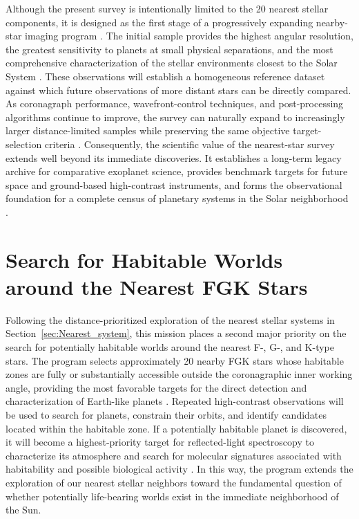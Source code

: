 Although the present survey is intentionally limited to the 20 nearest stellar components, it is designed as the first stage of a progressively expanding nearby-star imaging program \cite{LUVOIR2019}. 
The initial sample provides the highest angular resolution, the greatest sensitivity to planets at small physical separations, and the most comprehensive characterization of the stellar environments closest to the Solar System \cite{Guyon2006}. 
These observations will establish a homogeneous reference dataset against which future observations of more distant stars can be directly compared. As coronagraph performance, wavefront-control techniques, and post-processing algorithms continue to improve, the survey can naturally expand to increasingly larger distance-limited samples while preserving the same objective target-selection criteria \cite{Currie2022}. 
Consequently, the scientific value of the nearest-star survey extends well beyond its immediate discoveries. It establishes a long-term legacy archive for comparative exoplanet science, provides benchmark targets for future space and ground-based high-contrast instruments, and forms the observational foundation for a complete census of planetary systems in the Solar neighborhood \cite{LUVOIR2019}.

% 
\section{Search for Habitable Worlds around the Nearest FGK Stars}
\label{sec:Search-Habitable}

Following the distance-prioritized exploration of the nearest stellar systems in
Section~\ref{sec:Nearest_system}, this mission places a second major priority on the search for potentially
habitable worlds around the nearest F-, G-, and K-type stars. The program selects 
approximately 20 nearby FGK stars whose habitable zones are fully or substantially 
accessible outside the coronagraphic inner working angle, providing the most favorable 
targets for the direct detection and characterization of Earth-like planets
\cite{Kopparapu13,Stark2014}. Repeated high-contrast observations will be used to 
search for planets, constrain their orbits, and identify candidates located within the 
habitable zone. If a potentially habitable planet is discovered, it will become a 
highest-priority target for reflected-light spectroscopy to characterize its atmosphere 
and search for molecular signatures associated with habitability and possible biological 
activity \cite{Schwieterman2018}. In this way, the program extends the exploration of 
our nearest stellar neighbors toward the fundamental question of whether potentially 
life-bearing worlds exist in the immediate neighborhood of the Sun.

